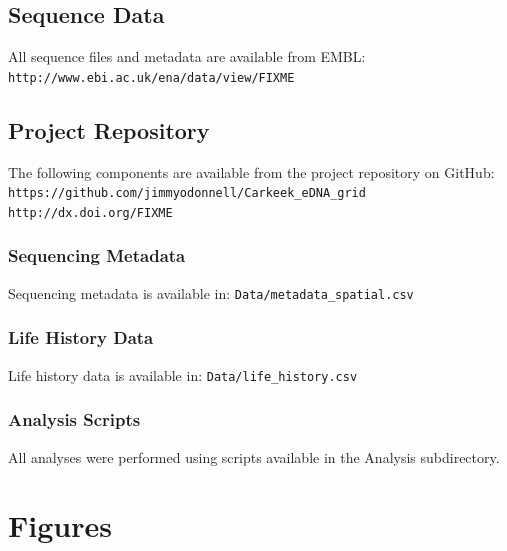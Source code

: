 \documentclass[11pt,letterpaper]{article} %
\begin{document}
\subsection{Sequence Data}
\label{sequence_data}
All sequence files and metadata are available from EMBL:\\ \verb!http://www.ebi.ac.uk/ena/data/view/FIXME!

\subsection{Project Repository}
The following components are available from the project repository on GitHub: \\
\verb!https://github.com/jimmyodonnell/Carkeek_eDNA_grid!\\
\verb!http://dx.doi.org/FIXME!

\subsubsection{Sequencing Metadata}
\label{sequencing_metadata}
Sequencing metadata is available in: \verb!Data/metadata_spatial.csv!

\subsubsection{Life History Data}
\label{life_history_data}
Life history data is available in: \verb!Data/life_history.csv!

\subsubsection{Analysis Scripts}
\label{analysis_scripts}
All analyses were performed using scripts available in the Analysis subdirectory.




\pagebreak
\section*{Figures}
\end{document}
